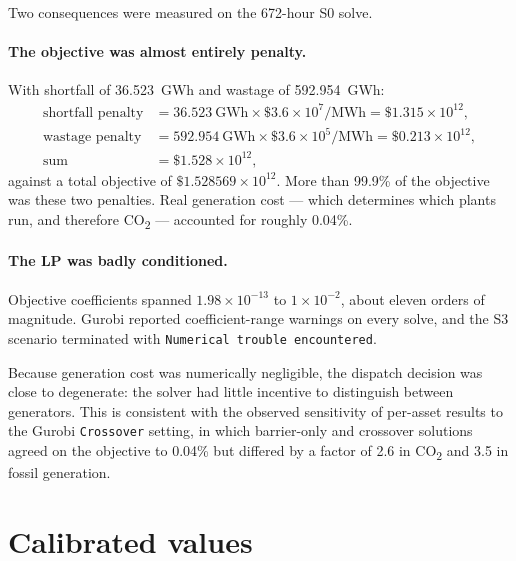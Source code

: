 \documentclass[11pt,a4paper]{article}
\newcommand{\COtwo}{CO\textsubscript{2}}
\begin{document}
Two consequences were measured on the 672-hour S0 solve.

\paragraph{The objective was almost entirely penalty.}
With shortfall of 36.523~GWh and wastage of 592.954~GWh:
\begin{align}
\text{shortfall penalty} &= 36.523~\text{GWh} \times \$3.6\times10^{7}/\text{MWh} = \$1.315\times10^{12}, \\
\text{wastage penalty}   &= 592.954~\text{GWh} \times \$3.6\times10^{5}/\text{MWh} = \$0.213\times10^{12}, \\
\text{sum}               &= \$1.528\times10^{12},
\end{align}
against a total objective of $\$1.528569\times10^{12}$. More than 99.9\% of the
objective was these two penalties. Real generation cost --- which determines
which plants run, and therefore \COtwo{} --- accounted for roughly 0.04\%.

\paragraph{The LP was badly conditioned.}
Objective coefficients spanned $1.98\times10^{-13}$ to $1\times10^{-2}$, about
eleven orders of magnitude. Gurobi reported coefficient-range warnings on every
solve, and the S3 scenario terminated with \texttt{Numerical trouble
encountered}.

Because generation cost was numerically negligible, the dispatch decision was
close to degenerate: the solver had little incentive to distinguish between
generators. This is consistent with the observed sensitivity of per-asset
results to the Gurobi \texttt{Crossover} setting, in which barrier-only and
crossover solutions agreed on the objective to 0.04\% but differed by a factor
of 2.6 in \COtwo{} and 3.5 in fossil generation.

\section{Calibrated values}
\end{document}
